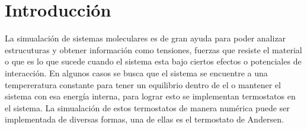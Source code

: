 \section{Introducción}
La simualación de sistemas moleculares es de gran ayuda para poder analizar estrucuturas y obtener información como tensiones, fuerzas
que resiste el material o que es lo que sucede cuando el sistema esta bajo ciertos efectos o potenciales de interacción. En algunos casos
se busca que el sistema se encuentre a una tempereratura constante para tener un equilibrio dentro de el o mantener el sistema con esa energía interna,
para lograr esto se implementan termostatos en el sistema. La simualación de estos termostatos de manera numérica puede ser implementada de
diversas formas, una de ellas es el termostato de Andersen.